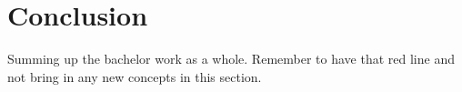 \chapter{Conclusion}

Summing up the bachelor work as a whole. Remember to have that red line and not bring in any new concepts in this section. 



\newpage